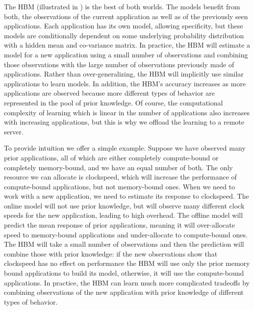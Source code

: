 The HBM (illustrated in ) is the best of both worlds. The models benefit from both, the observations of the current application as well as of the previously seen applications.  Each
application has its own model, allowing specificity, but these models
are conditionally dependent on some underlying probability
distribution with a hidden mean and co-variance matrix.  In practice,
the HBM will estimate a model for a new application using a small
number of observations and combining those observations with the large
number of observations previously made of applications.
Rather than over-generalizing, the HBM will implicitly use similar
applications to learn models.  In addition, the HBM's accuracy
increases as more applications are observed because more different
types of behavior are represented in the pool of prior knowledge.  Of
course, the computational complexity of learning which is linear in the number of applications also increases with
increasing applications, but this is why we offload the learning to a
remote server.

To provide intuition we offer a simple example.  Suppose we have
observed many prior applications, all of which are either completely
compute-bound or completely memory-bound, and we have an equal number
of both.  The only resource we can allocate is clockspeed, which will
increase the performance of compute-bound applications, but not
memory-bound ones.  When we need to work with a new application, we
need to estimate its response to clockspeed.  The online model will
not use prior knowledge, but will observe many different clock speeds
for the new application, leading to high overhead.  The offline model
will predict the mean response of prior applications, meaning it will
over-allocate speed to memory-bound applications and under-allocate to
compute-bound ones.  The HBM will take a small number of observations
and then the prediction will combine those with prior knowledge: if
the new observations show that clockspeed has no effect on performance
the HBM will use only the prior memory bound applications to build its
model, otherwise, it will use the compute-bound applications.  In
practice, the HBM can learn much more complicated tradeoffs by
combining observations of the new application with prior knowledge of
different types of behavior.






